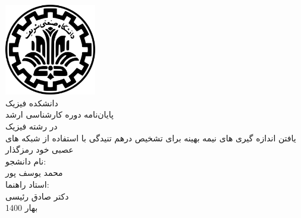\pagestyle{empty}
\begin{center}
\includegraphics[width=0.3\textwidth]{files/logo.png}\\
\Nastaliq
\large{دانشکده فیزیک}\\\vspace{1cm}
\titlefont
\large{ پایان‌نامه دوره کارشناسی ارشد}\\
\large{در رشته فیزیک}\\
\vspace{1cm}
\Large{یافتن اندازه گیری های نیمه بهینه برای تشخیص درهم تنیدگی با استفاده از شبکه های عصبی خود رمزگذار}\\\vspace{2cm}
\normalsize{نام دانشجو:}\\
\large{محمد یوسف پور}\\\vspace{2cm}
\normalsize{استاد راهنما:}\\
\large{دکتر صادق رئیسی}\\\vspace{2cm}
\normalsize{بهار 1400}

\end{center}
\newpage\null\newpage
